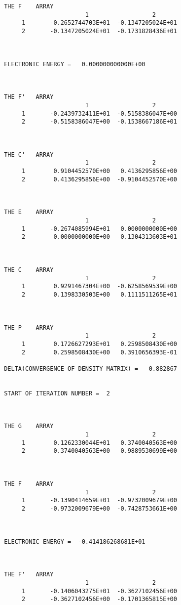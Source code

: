 \begin{verbatim}
 THE F    ARRAY
                        1                  2
      1       -0.2652744703E+01  -0.1347205024E+01
      2       -0.1347205024E+01  -0.1731828436E+01



 ELECTRONIC ENERGY =   0.000000000000E+00



 THE F'   ARRAY
                        1                  2
      1       -0.2439732411E+01  -0.5158386047E+00
      2       -0.5158386047E+00  -0.1538667186E+01



 THE C'   ARRAY
                        1                  2
      1        0.9104452570E+00   0.4136295856E+00
      2        0.4136295856E+00  -0.9104452570E+00



 THE E    ARRAY
                        1                  2
      1       -0.2674085994E+01   0.0000000000E+00
      2        0.0000000000E+00  -0.1304313603E+01



 THE C    ARRAY
                        1                  2
      1        0.9291467304E+00  -0.6258569539E+00
      2        0.1398330503E+00   0.1111511265E+01



 THE P    ARRAY
                        1                  2
      1        0.1726627293E+01   0.2598508430E+00
      2        0.2598508430E+00   0.3910656393E-01

 DELTA(CONVERGENCE OF DENSITY MATRIX) =   0.882867


 START OF ITERATION NUMBER =  2



 THE G    ARRAY
                        1                  2
      1        0.1262330044E+01   0.3740040563E+00
      2        0.3740040563E+00   0.9889530699E+00



 THE F    ARRAY
                        1                  2
      1       -0.1390414659E+01  -0.9732009679E+00
      2       -0.9732009679E+00  -0.7428753661E+00



 ELECTRONIC ENERGY =  -0.414186268681E+01



 THE F'   ARRAY
                        1                  2
      1       -0.1406043275E+01  -0.3627102456E+00
      2       -0.3627102456E+00  -0.1701365815E+00




\end{verbatim}
